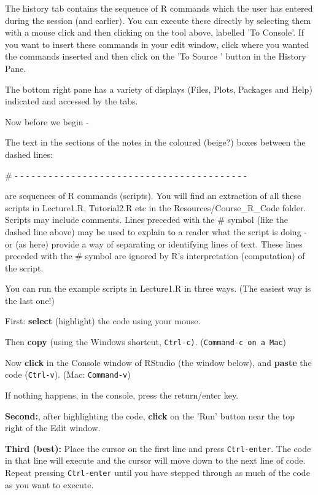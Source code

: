 \documentclass[titlepage]{book}\usepackage{knitr}
\begin{document}
The history tab contains the sequence of R commands which the user has entered during the session (and earlier). You can execute these directly by selecting them with a mouse click and then clicking on the tool above, labelled 'To Console'. If you want to insert these commands in your edit window, click where you wanted the commands inserted and then click on the 'To Source ' button in the History Pane.


The bottom right pane has a variety of displays (Files, Plots, Packages and Help) indicated and accessed by the tabs.

Now before we begin -

The text in the sections of the notes in the coloured (beige?) boxes between the dashed lines:

\# - - - - - - - - - - - - - - - - - - - - - - - - - - - - - - - - - - - - - - - - -

are sequences of R commands (scripts). You will find an extraction of all these scripts in Lecture1.R, Tutorial2.R etc in the Resources/Course\_R\_Code folder.
Scripts may include comments. Lines preceded with the \# symbol (like the dashed line above) may be used to explain to a reader what the script is doing - or (as here) provide a way of separating or identifying lines of text. These lines preceded with the \# symbol are ignored by R's interpretation (computation) of the script.

You can run the example scripts in Lecture1.R in three ways.
(The easiest way is the last one!)

First: \textbf{select} (highlight) the code using your mouse.

Then \textbf{copy} (using the Windows shortcut, \texttt{Ctrl-c)}. (\texttt{Command-c on a Mac})

Now \textbf{click} in the Console window of RStudio (the window below), and \textbf{paste} the code (\texttt{Ctrl-v}). (Mac: \texttt{Command-v})

If nothing happens, in the console, press the return/enter key.

\textbf{Second:}, after highlighting the code, \textbf{click} on the 'Run' button near the top right of the Edit window.

\textbf{Third (best):} Place the cursor on the first line and press \texttt{Ctrl-enter}. The code in that line will execute and the cursor will move down to the next line of code. Repeat pressing \texttt{Ctrl-enter} until you have stepped through as much of the code as you want to execute.
\end{document}

